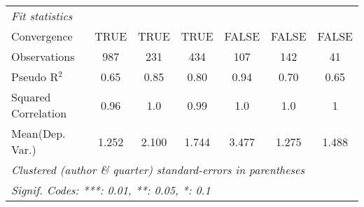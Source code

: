 \begin{tabular}{lcccccc}
   \midrule
   \emph{Fit statistics}\\
   Convergence                                                &TRUE           & TRUE       & TRUE        & FALSE        & FALSE         & FALSE\\  
   Observations                                               & 987           & 231        & 434         & 107          & 142           & 41\\  
   Pseudo R$^2$                                               & 0.65          & 0.85       & 0.80        & 0.94         & 0.70          & 0.65\\  
   Squared Correlation                                        & 0.96          & 1.0        & 0.99        & 1.0          & 1.0           & 1\\  
Mean(Dep. Var.) & 1.252 & 2.100 & 1.744 & 3.477 & 1.275 & 1.488 \\
   \midrule \midrule
   \multicolumn{7}{l}{\emph{Clustered (author \& quarter) standard-errors in parentheses}}\\
   \multicolumn{7}{l}{\emph{Signif. Codes: ***: 0.01, **: 0.05, *: 0.1}}\\
\end{tabular}
\par\endgroup
